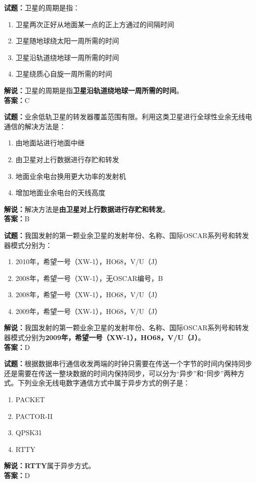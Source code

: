 \documentclass{ctexbook}
\begin{document}
\bigskip


\noindent\textbf{试题：}卫星的周期是指：
\begin{enumerate}[leftmargin=3em]
\item 卫星两次正好从地面某一点的正上方通过的间隔时间
\item 卫星随地球绕太阳一周所需的时间
\item 卫星沿轨道绕地球一周所需的时间
\item 卫星绕质心自旋一周所需的时间
\end{enumerate}
\noindent\textbf{解说：}卫星的周期是指\textbf{卫星沿轨道绕地球一周所需的时间}。\\\noindent\textbf{答案：}C



\bigskip


\noindent\textbf{试题：}业余低轨卫星的转发器覆盖范围有限。利用这类卫星进行全球性业余无线电通信的解决方法是：
\begin{enumerate}[leftmargin=3em]
\item 由地面站进行地面中继
\item 由卫星对上行数据进行存贮和转发
\item 地面业余电台换用更大功率的发射机
\item 增加地面业余电台的天线高度
\end{enumerate}
\noindent\textbf{解说：}解决方法是\textbf{由卫星对上行数据进行存贮和转发}。\\\noindent\textbf{答案：}B




\bigskip


\noindent\textbf{试题：}我国发射的第一颗业余卫星的发射年份、名称、国际OSCAR系列号和转发器模式分别为：
\begin{enumerate}[leftmargin=3em]
\item 2010年，希望一号（XW-1），HO68，V/U（J）
\item 2008年，希望一号（XW-1），无OSCAR编号，B
\item 2008年，希望一号（XW-1），HO68，V/U（J）
\item 2009年，希望一号（XW-1），HO68，V/U（J）
\end{enumerate}
\noindent\textbf{解说：}我国发射的第一颗业余卫星的发射年份、名称、国际OSCAR系列号和转发器模式分别为\textbf{2009年，希望一号（XW-1），HO68，V/U（J）}。\\\noindent\textbf{答案：}D




\bigskip


\noindent\textbf{试题：}根据数据串行通信收发两端的时钟只需要在传送一个字节的时间内保持同步还是需要在传送一整块数据的时间内保持同步，可以分为“异步”和“同步”两种方式。下列业余无线电数字通信方式中属于异步方式的例子是：
\begin{enumerate}[leftmargin=3em]
\item PACKET
\item PACTOR-II
\item QPSK31
\item RTTY
\end{enumerate}
\noindent\textbf{解说：}\textbf{RTTY}属于异步方式。\\\noindent\textbf{答案：}D
\end{document}

